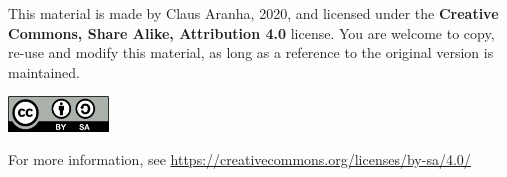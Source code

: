 \begin{frame}
  This material is made by Claus Aranha, 2020, and licensed under the
  {\bf Creative Commons, Share Alike, Attribution 4.0} license. You are
  welcome to copy, re-use and modify this material, as long as a reference
  to the original version is maintained.
  \bigskip

  \begin{center}
    \includegraphics[width=0.2\textwidth]{../img/cc_by_sa}
  \end{center}
  \bigskip

  For more information, see \url{https://creativecommons.org/licenses/by-sa/4.0/}
\end{frame}

